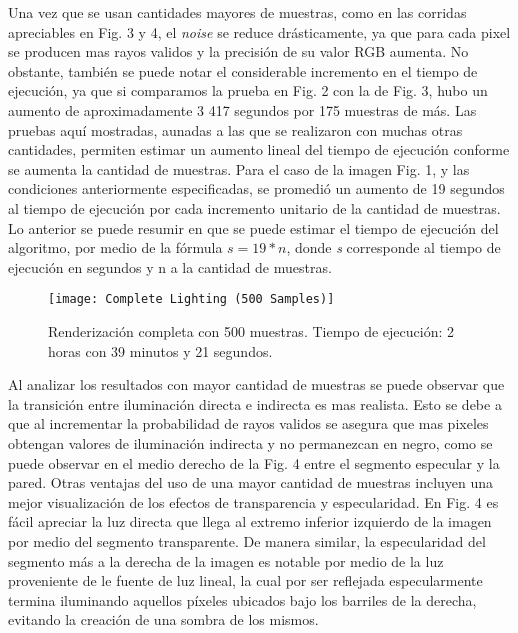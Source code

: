 \documentclass[conference]{IEEEtran}
\begin{document}
Una vez que se usan cantidades mayores de muestras, como en las corridas apreciables en Fig. 3 y 4, el \textit{noise} se reduce drásticamente, ya que para cada pixel se producen mas rayos validos y la precisión de su valor RGB aumenta. No obstante, también se puede notar el considerable incremento en el tiempo de ejecución, ya que si comparamos la prueba en Fig. 2 con la de Fig. 3, hubo un aumento de aproximadamente 3 417 segundos por 175 muestras de más. Las pruebas aquí mostradas, aunadas a las que se realizaron con muchas otras cantidades, permiten estimar un aumento lineal del tiempo de ejecución conforme se aumenta la cantidad de muestras. Para el caso de la imagen Fig. 1, y las condiciones anteriormente especificadas, se promedió un aumento de 19 segundos al tiempo de ejecución por cada incremento unitario de la cantidad de muestras. Lo anterior se puede resumir en que se puede estimar el tiempo de ejecución del algoritmo, por medio de la fórmula \(s = 19 * n\), donde \textit{s} corresponde al tiempo de ejecución en segundos y n a la cantidad de muestras.

\begin{figure}[htbp]
\centerline{\texttt{[image: Complete Lighting (500 Samples)]}}
\caption{Renderización completa con 500 muestras. Tiempo de ejecución: 2 horas con 39 minutos y 21 segundos.}
\label{500 muestras completo}
\end{figure}

Al analizar los resultados con mayor cantidad de muestras se puede observar que la transición entre iluminación directa e indirecta es mas realista. Esto se debe a que al incrementar la probabilidad de rayos validos se asegura que mas pixeles obtengan valores de iluminación indirecta y no permanezcan en negro, como se puede observar en el medio derecho de la Fig. 4 entre el segmento especular y la pared. Otras ventajas del uso de una mayor cantidad de muestras incluyen una mejor visualización de los efectos de transparencia y especularidad. En Fig. 4 es fácil apreciar la luz directa que llega al extremo inferior izquierdo de la imagen por medio del segmento transparente. De manera similar, la especularidad del segmento más a la derecha de la imagen es notable por medio de la luz proveniente de le fuente de luz lineal, la cual por ser reflejada especularmente termina iluminando aquellos píxeles ubicados bajo los barriles de la derecha, evitando la creación de una sombra de los mismos.
\end{document}
